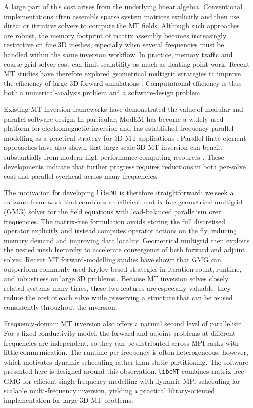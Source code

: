 \documentclass{article}
\begin{document}
A large part of this cost arises from the underlying linear algebra. Conventional implementations often assemble sparse system matrices explicitly and then use direct or iterative solvers to compute the MT fields. Although such approaches are robust, the memory footprint of matrix assembly becomes increasingly restrictive on fine 3D meshes, especially when several frequencies must be handled within the same inversion workflow. In practice, memory traffic and coarse‑grid solver cost can limit scalability as much as floating‑point work. Recent MT studies have therefore explored geometrical multigrid strategies to improve the efficiency of large 3D forward simulations \citep{WangEtAl2022,HuangEtAl2023}. Computational efficiency is thus both a numerical-analysis problem and a software-design problem.

Existing MT inversion frameworks have demonstrated the value of modular and parallel software design. In particular, ModEM has become a widely used platform for electromagnetic inversion and has established frequency‑parallel modelling as a practical strategy for 3D MT applications \citep{EgbertKelbert2012,KelbertEtAl2014}. Parallel finite‑element approaches have also shown that large‑scale 3D MT inversion can benefit substantially from modern high‑performance computing resources \citep{GrayverEtAl2015}. These developments indicate that further progress requires reductions in both per-solve cost and parallel overhead across many frequencies.

The motivation for developing \texttt{libcMT} is therefore straightforward: we seek a software framework that combines an efficient matrix-free geometrical multigrid (GMG) solver for the field equations with load-balanced parallelism over frequencies. The matrix-free formulation avoids storing the full discretised operator explicitly and instead computes operator actions on the fly, reducing memory demand and improving data locality. Geometrical multigrid then exploits the nested mesh hierarchy to accelerate convergence of both forward and adjoint solves. Recent MT forward-modelling studies have shown that GMG can outperform commonly used Krylov-based strategies in iteration count, runtime, and robustness on large 3D problems \citep{WangEtAl2022,HuangEtAl2023}. Because MT inversion solves closely related systems many times, these two features are especially valuable: they reduce the cost of each solve while preserving a structure that can be reused consistently throughout the inversion.

Frequency‑domain MT inversion also offers a natural second level of parallelism. For a fixed conductivity model, the forward and adjoint problems at different frequencies are independent, so they can be distributed across MPI ranks with little communication. The runtime per frequency is often heterogeneous, however, which motivates dynamic scheduling rather than static partitioning. The software presented here is designed around this observation. \texttt{libcMT} combines matrix‑free GMG for efficient single‑frequency modelling with dynamic MPI scheduling for scalable multi‑frequency inversion, yielding a practical library-oriented implementation for large 3D MT problems.
\end{document}
